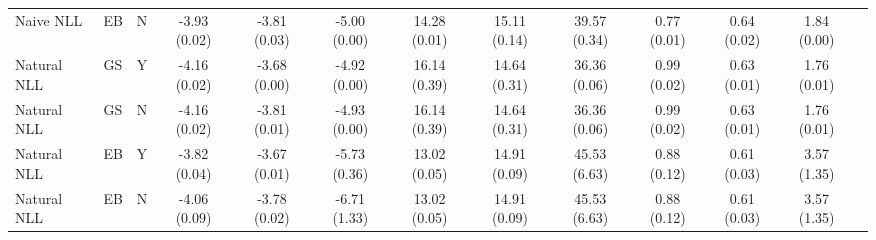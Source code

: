 \begin{table}
\begin{tabular}{|l|l|l|c|c|c|c|c|c|c|c|c|c|}
        Naive NLL &             EB &                    N & -3.93 (0.02) & -3.81 (0.03) & -5.00 (0.00) &    14.28 (0.01) &     15.11 (0.14) &      39.57 (0.34) &       0.77 (0.01) &        0.64 (0.02) &         1.84 (0.00) \\
      Natural NLL &             GS &                    Y & -4.16 (0.02) & -3.68 (0.00) & -4.92 (0.00) &    16.14 (0.39) &     14.64 (0.31) &      36.36 (0.06) &       0.99 (0.02) &        0.63 (0.01) &         1.76 (0.01) \\
      Natural NLL &             GS &                    N & -4.16 (0.02) & -3.81 (0.01) & -4.93 (0.00) &    16.14 (0.39) &     14.64 (0.31) &      36.36 (0.06) &       0.99 (0.02) &        0.63 (0.01) &         1.76 (0.01) \\
      Natural NLL &             EB &                    Y & -3.82 (0.04) & -3.67 (0.01) & -5.73 (0.36) &    13.02 (0.05) &     14.91 (0.09) &      45.53 (6.63) &       0.88 (0.12) &        0.61 (0.03) &         3.57 (1.35) \\
      Natural NLL &             EB &                    N & -4.06 (0.09) & -3.78 (0.02) & -6.71 (1.33) &    13.02 (0.05) &     14.91 (0.09) &      45.53 (6.63) &       0.88 (0.12) &        0.61 (0.03) &         3.57 (1.35) \\
\bottomrule
\end{tabular}
\end{table}
